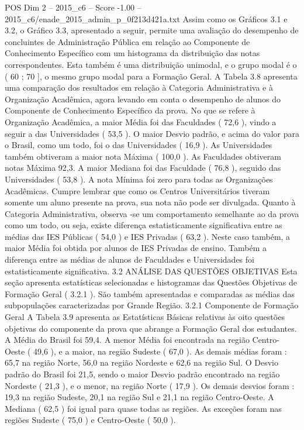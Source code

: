 \begin{textsample}{POS Dim 2 – 2015\_c6 – Score -1.00 – 2015\_c6/enade\_2015\_admin\_p\_0f213d421a.txt}
Assim como os Gráficos 3.1 e 3.2, o Gráfico 3.3, apresentado a seguir, permite uma avaliação do desempenho de concluintes de Administração Pública em relação ao Componente de Conhecimento Específico com um histograma da distribuição das notas correspondentes.
Esta também é uma distribuição unimodal, e o grupo modal é o ( 60 ; 70 ], o mesmo grupo modal para a Formação Geral.
A Tabela 3.8 apresenta uma comparação dos resultados em relação à Categoria Administrativa e à Organização Acadêmica, agora levando em conta o desempenho de alunos do Componente de Conhecimento Específico da prova.
No que se refere à Organização Acadêmica, a maior Média foi das Faculdades ( 72,6 ), vindo a seguir a das Universidades ( 53,5 ).
O maior Desvio padrão, e acima do valor para o Brasil, como um todo, foi o das Universidades ( 16,9 ).
As Universidades também obtiveram a maior nota Máxima ( 100,0 ).
As Faculdades obtiveram notas Máxima 92,3.
A maior Mediana foi das Faculdade ( 76,8 ), seguido das Universidades ( 53,8 ).
A nota Mínima foi zero para todas as Organizações Acadêmicas.
Cumpre lembrar que como os Centros Universitários tiveram somente um aluno presente na prova, sua nota não pode ser divulgada.
Quanto à Categoria Administrativa, observa -se um comportamento semelhante ao da prova como um todo, ou seja, existe diferença estatisticamente significativa entre as médias das IES Públicas ( 54,0 ) e IES Privadas ( 63,2 ).
Neste caso também, a maior Média foi obtida por alunos de IES Privadas de ensino.
Também a diferença entre as médias de alunos de Faculdades e Universidades foi estatisticamente significativa. 3.2 ANÁLISE DAS QUESTÕES OBJETIVAS Esta seção apresenta estatísticas selecionadas e histogramas das Questões Objetivas de Formação Geral ( 3.2.1 ).
São também apresentadas e comparadas as médias das subpopulações caracterizadas por Grande Região. 3.2.1 Componente de Formação Geral A Tabela 3.9 apresenta as Estatísticas Básicas relativas às oito questões objetivas do componente da prova que abrange a Formação Geral dos estudantes.
A Média do Brasil foi 59,4.
A menor Média foi encontrada na região Centro-Oeste ( 49,6 ), e a maior, na região Sudeste ( 67,0 ).
As demais médias foram : 65,7 na região Norte, 56,0 na região Nordeste e 62,6 na região Sul.
O Desvio padrão do Brasil foi 21,5, sendo o maior Desvio padrão encontrado na região Nordeste ( 21,3 ), e o menor, na região Norte ( 17,9 ).
Os demais desvios foram : 19,3 na região Sudeste, 20,1 na região Sul e 21,1 na região Centro-Oeste.
A Mediana ( 62,5 ) foi igual para quase todas as regiões.
As exceções foram nas regiões Sudeste ( 75,0 ) e Centro-Oeste ( 50,0 ).

\end{textsample}
